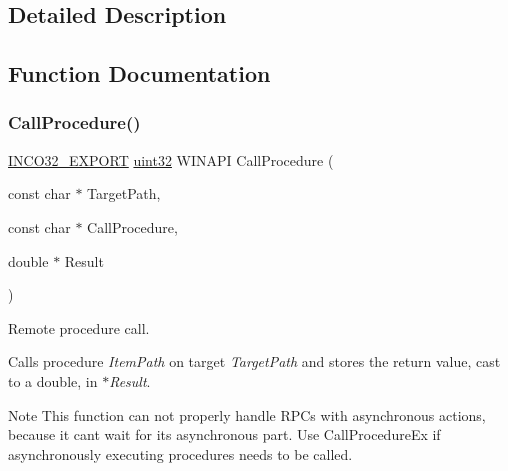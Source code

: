\subsection{Detailed Description}


\subsection{Function Documentation}
\mbox{\label{group__commonfunctions_gaa2b02d8d33d22482538bd936792904b1}} 
\subsubsection{\texorpdfstring{Call\+Procedure()}{CallProcedure()}}
{\footnotesize\ttfamily \hyperlink{inco__32_8h_a09505cad5bbb66fc36750a4fbca0444b}{I\+N\+C\+O32\+\_\+\+E\+X\+P\+O\+RT} \hyperlink{indeltypes_8h_a4b435a49c74bb91f284f075e63416cb6}{uint32} W\+I\+N\+A\+PI Call\+Procedure (\begin{DoxyParamCaption}\item[{const char $\ast$}]{Target\+Path,  }\item[{const char $\ast$}]{Call\+Procedure,  }\item[{double $\ast$}]{Result }\end{DoxyParamCaption})}



Remote procedure call. 

Calls procedure {\itshape Item\+Path} on target {\itshape Target\+Path} and stores the return value, cast to a {\ttfamily double}, in {\itshape $\ast$\+Result}. \begin{DoxyNote}{Note}
This function can not properly handle R\+P\+Cs with asynchronous actions, because it can\textquotesingle{}t wait for its asynchronous part. Use Call\+Procedure\+Ex if asynchronously executing procedures needs to be called. 
\end{DoxyNote}

